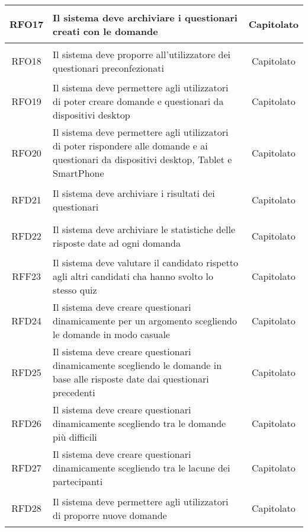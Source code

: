 \begin{longtable}{|c|>{\centering}m{7cm}|c|}
\hypertarget{RFO17}{RFO17} & Il sistema deve archiviare i questionari creati con le domande & Capitolato
\\ \hline

\hypertarget{RFO18}{RFO18} & Il sistema deve proporre all’utilizzatore dei questionari preconfezionati & Capitolato
\\ \hline

\hypertarget{RFO19}{RFO19} & Il sistema deve permettere agli utilizzatori di poter creare domande e questionari da dispositivi desktop & Capitolato
\\ \hline

\hypertarget{RFO20}{RFO20} & Il sistema deve permettere agli utilizzatori di poter rispondere alle domande e ai questionari da dispositivi desktop, Tablet e SmartPhone & Capitolato
\\ \hline

\hypertarget{RFD21}{RFD21} & Il sistema deve archiviare i risultati dei questionari & Capitolato
\\ \hline

\hypertarget{RFD22}{RFD22} & Il sistema deve archiviare le statistiche delle risposte date ad ogni domanda & Capitolato
\\ \hline

\hypertarget{RFF23}{RFF23} & Il sistema deve valutare il candidato rispetto agli altri candidati cha hanno svolto lo stesso quiz & Capitolato
\\ \hline

\hypertarget{RFD24}{RFD24} & Il sistema deve creare questionari dinamicamente per un argomento scegliendo le domande in modo casuale & Capitolato
\\ \hline

\hypertarget{RFD25}{RFD25} & Il sistema deve creare questionari dinamicamente scegliendo le domande in base alle risposte date dai questionari precedenti & Capitolato
\\ \hline

\hypertarget{RFD26}{RFD26} & Il sistema deve creare questionari dinamicamente scegliendo tra le domande più difficili & Capitolato
\\ \hline

\hypertarget{RFD27}{RFD27} & Il sistema deve creare questionari dinamicamente scegliendo tra le lacune dei partecipanti & Capitolato
\\ \hline

\hypertarget{RFD28}{RFD28} & Il sistema deve permettere agli utilizzatori di proporre nuove domande & Capitolato
\\ \hline


\end{longtable}
